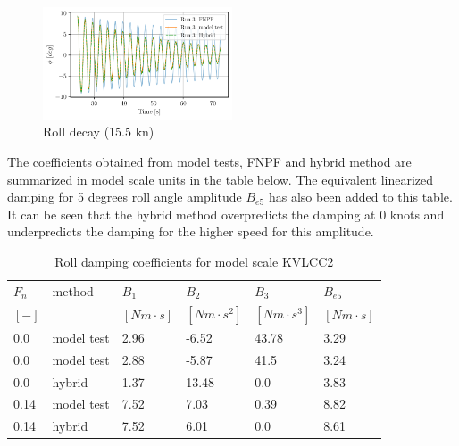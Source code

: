     \begin{figure}[H]
        \begin{center}\includegraphics[width = 0.5\textwidth]{figures/hybrid_speed_time.pdf}\end{center}
        \vspace{-1cm}
        \caption{Roll decay (15.5 kn)}
        \label{fig:hybrid_speed_time}
    \end{figure}
    
    The coefficients obtained from model tests, FNPF and hybrid method are
summarized in model scale units in the table below. The equivalent
linearized damping for 5 degrees roll angle amplitude $B_{e5}$ has
also been added to this table. It can be seen that the hybrid method
overpredicts the damping at 0 knots and underpredicts the damping for
the higher speed for this amplitude.
 
            
    
    
\begin{table}[H]
\scriptsize
\center
\caption{Roll damping coefficients for model scale KVLCC2}
\label{tab:results}
\begin{tabular}{|l|l|l|l|l|l|}
\hline\addlinespace
$F_n$ & method & $B_1$ & $B_2$ & $B_3$ & $B_{e5}$\\ 
$[-]$ &  & $[Nm \cdot s]$ & $[Nm \cdot s^2]$ & $[Nm \cdot s^3]$ & $[Nm \cdot s]$\\ 
\hline0.0 & model test & 2.96 & -6.52 & 43.78 & 3.29\\ 
0.0 & model test & 2.88 & -5.87 & 41.5 & 3.24\\ 
0.0 & hybrid & 1.37 & 13.48 & 0.0 & 3.83\\ 
0.14 & model test & 7.52 & 7.03 & 0.39 & 8.82\\ 
0.14 & hybrid & 7.52 & 6.01 & 0.0 & 8.61\\ 

\hline
\end{tabular}
\end{table}

    

    